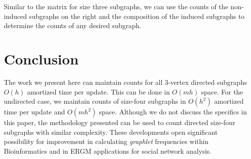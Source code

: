 \documentclass[11pt]{article}
\begin{document}
Similar to the matrix for size three subgraphs, we can use the counts of the non-induced subgraphs on the right and the composition of the induced subgraphs to determine the counts of any desired subgraph.

\section{Conclusion}

The work we present here can maintain counts for all 3-vertex directed subgraphs 
$O(h)$ amortized time per update.  This can be done in 
$O(mh)$ space.  For the undirected case, we maintain counts of size-four subgraphs
in $O(h^2)$ amortized time per update and $O(mh^2)$ space.  Although we do not discuss the specifics in this paper, the methodology presented 
can be used to count directed size-four subgraphs with similar complexity. 
These developments open significant possibility for improvement in calculating \emph{graphlet} 
frequencies within Bioinformatics and in ERGM applications for 
social network analysis. 
\end{document}
